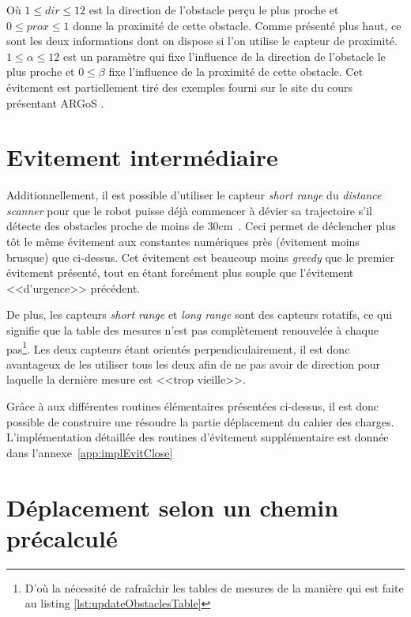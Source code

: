 Où $ 1 \leq dir \leq 12 $ est la direction de l'obstacle perçu le plus proche et \hbox{$0 \leq prox \leq 1$} donne la proximité de cette obstacle. Comme présenté plus haut, ce sont les deux informations dont on dispose si l'on utilise le capteur de proximité.  \(1 \leq \alpha \leq 12 \) est un paramètre qui fixe l'influence de la direction de l'obstacle le plus proche et \(0 \leq \beta \) fixe l'influence de la proximité de cette obstacle. Cet évitement est partiellement tiré des exemples fourni sur le site du cours présentant ARGoS \cite{argosSite1}.

\section{Evitement intermédiaire}

Additionnellement, il est possible d'utiliser le capteur \emph{short range} du \emph{distance scanner} pour que le robot puisse déjà commencer à dévier sa trajectoire s'il détecte des obstacles proche de moins de 30cm~\cite{argosSite1}. Ceci permet de déclencher plus tôt le même évitement aux constantes numériques près (évitement moins brusque) que ci-dessus. Cet évitement est beaucoup moins \emph{greedy} que le premier évitement présenté, tout en étant forcément plus souple que l'évitement <<d'urgence>> précédent.

De plus, les capteurs \emph{short range} et \emph{long range} sont des capteurs rotatifs, ce qui signifie que la table des mesures n'est pas complètement renouvelée à chaque pas\footnote{D'où la nécessité de rafraîchir les tables de mesures de la manière qui est faite au listing \ref{lst:updateObstaclesTable}}. Les deux capteurs étant orientés perpendiculairement, il est donc avantageux de les utiliser tous les deux afin de ne pas avoir de direction pour laquelle la dernière mesure est <<trop vieille>>.

Grâce à aux différentes routines élémentaires présentées ci-dessus, il est donc possible de construire une résoudre la partie déplacement du cahier des charges. L'implémentation détaillée des routines d'évitement supplémentaire est donnée dans l'annexe~\ref{app:implEvitClose}

\section{Déplacement selon un chemin précalculé}

